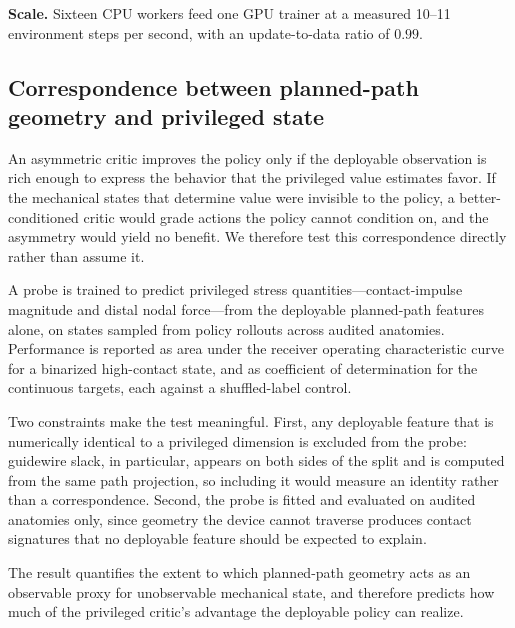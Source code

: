 \textbf{Scale.} Sixteen CPU workers feed one GPU trainer at a measured 10--11 environment steps
per second, with an update-to-data ratio of $0.99$.

\subsection{Correspondence between planned-path geometry and privileged state}
\label{sec:correspondence}


An asymmetric critic improves the policy only if the deployable observation is rich enough to
express the behavior that the privileged value estimates favor. If the mechanical states that
determine value were invisible to the policy, a better-conditioned critic would grade actions the
policy cannot condition on, and the asymmetry would yield no benefit. We therefore test this
correspondence directly rather than assume it.

A probe is trained to predict privileged stress quantities---contact-impulse magnitude and distal
nodal force---from the deployable planned-path features alone, on states sampled from policy
rollouts across audited anatomies. Performance is reported as area under the receiver operating
characteristic curve for a binarized high-contact state, and as coefficient of determination for
the continuous targets, each against a shuffled-label control.

Two constraints make the test meaningful. First, any deployable feature that is numerically
identical to a privileged dimension is excluded from the probe: guidewire slack, in particular,
appears on both sides of the split and is computed from the same path projection, so including it
would measure an identity rather than a correspondence. Second, the probe is fitted and evaluated
on audited anatomies only, since geometry the device cannot traverse produces contact signatures
that no deployable feature should be expected to explain.

The result quantifies the extent to which planned-path geometry acts as an observable proxy for
unobservable mechanical state, and therefore predicts how much of the privileged critic's
advantage the deployable policy can realize.

